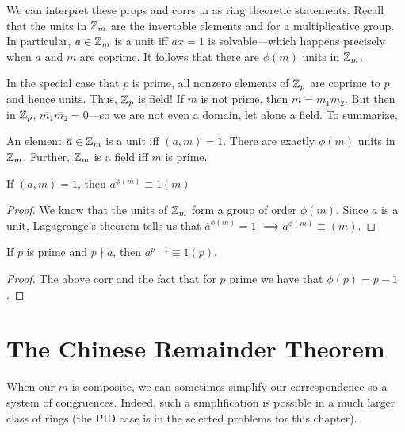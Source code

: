 We can interpret these props and corrs in as ring theoretic statements. Recall
that the units in \(\mathbb{Z}_m\) are the invertable elements and for a multiplicative
group. In particular, \(a \in \mathbb{Z} _m\) is a unit iff \(ax=1\) is
solvable---which happens precisely when \(a\) and \(m\) are coprime. It follows
that there are \(\phi(m)\) units in \(\mathbb{Z}_m\).

In the special case that \(p\) is
prime, all nonzero elements of \(\mathbb{Z}_p\) are coprime to \(p\) and hence units.
Thus, \(\mathbb{Z} _p\) is field! If \(m\) is not prime, then \(m=m_1m_2\). But then in
\(\mathbb{Z} _p\), \(\overline{m_1} \overline{m_2}=\overline{0}\)---so we are not even
a domain, let alone a field. To summarize,

\begin{prop}
  An element \(\overline{a} \in \mathbb{Z} _m\) is a unit iff \((a,m)=1\). There are
  exactly \(\phi(m)\) units in \(\mathbb{Z} _m\). Further, \(\mathbb{Z} _m\) is a field iff
  \(m\) is prime.
\end{prop}

\begin{corollary} 
If \((a,m)=1\), then \(a^{\phi(m)}\equiv 1(m)\)
\end{corollary}

\begin{proof}
  We know that the units of \(\mathbb{Z} _m\) form a group of order \(\phi(m)\). Since
  \(a\) is a unit, Lagagrange's theorem tells us that
  \(\overline{a}^{\phi(m)}=\overline{1}\) \(\implies a^{\phi(m)}\equiv (m)\).
\end{proof}

\begin{corollary} 
  If \(p\) is prime and \(p \nmid a\), then \(a^{p-1}\equiv 1 (p)\).
\end{corollary}

\begin{proof}
  The above corr and the fact that for \(p\) prime we have that \(\phi(p)=p-1\).
\end{proof}


\section{The Chinese Remainder Theorem}%

When our \(m\) is composite, we can sometimes simplify our correspondence so a
system of congruences. Indeed, such a simplification is possible in a much
larger class of rings (the PID case is in the selected problems for this
chapter).


